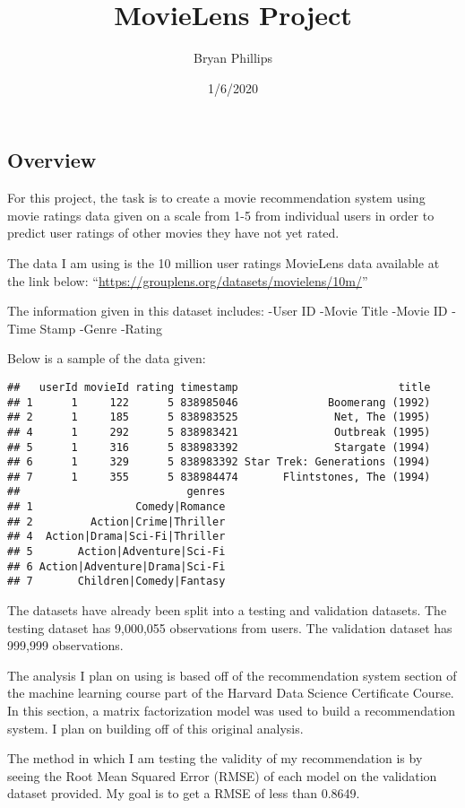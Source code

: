 \documentclass[]{article}
\title{MovieLens Project}
\author{Bryan Phillips}
\date{1/6/2020}
\begin{document}
\maketitle

\subsection{Overview}\label{overview}

For this project, the task is to create a movie recommendation system
using movie ratings data given on a scale from 1-5 from individual users
in order to predict user ratings of other movies they have not yet
rated.

The data I am using is the 10 million user ratings MovieLens data
available at the link below:
``\url{https://grouplens.org/datasets/movielens/10m/}''

The information given in this dataset includes: -User ID -Movie Title
-Movie ID -Time Stamp -Genre -Rating

Below is a sample of the data given:

\begin{verbatim}
##   userId movieId rating timestamp                         title
## 1      1     122      5 838985046              Boomerang (1992)
## 2      1     185      5 838983525               Net, The (1995)
## 4      1     292      5 838983421               Outbreak (1995)
## 5      1     316      5 838983392               Stargate (1994)
## 6      1     329      5 838983392 Star Trek: Generations (1994)
## 7      1     355      5 838984474       Flintstones, The (1994)
##                          genres
## 1                Comedy|Romance
## 2         Action|Crime|Thriller
## 4  Action|Drama|Sci-Fi|Thriller
## 5       Action|Adventure|Sci-Fi
## 6 Action|Adventure|Drama|Sci-Fi
## 7       Children|Comedy|Fantasy
\end{verbatim}

The datasets have already been split into a testing and validation
datasets. The testing dataset has 9,000,055 observations from users. The
validation dataset has 999,999 observations.

The analysis I plan on using is based off of the recommendation system
section of the machine learning course part of the Harvard Data Science
Certificate Course. In this section, a matrix factorization model was
used to build a recommendation system. I plan on building off of this
original analysis.

The method in which I am testing the validity of my recommendation is by
seeing the Root Mean Squared Error (RMSE) of each model on the
validation dataset provided. My goal is to get a RMSE of less than
0.8649.
\end{document}
